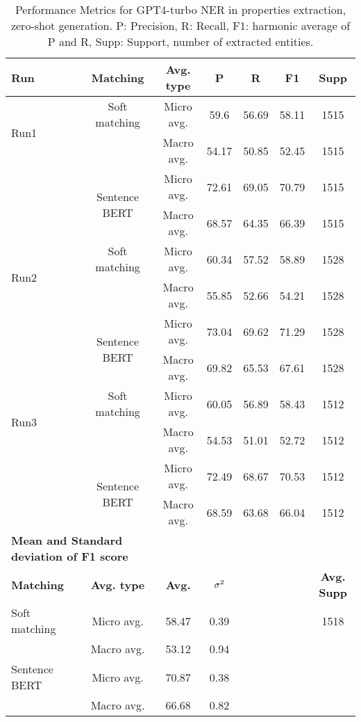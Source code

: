 \begin{table}[htbp]
\small
  \centering
  \caption{Performance Metrics for GPT4-turbo NER in properties extraction, zero-shot generation. P: Precision, R: Recall, F1: harmonic average of P and R, Supp: Support, number of extracted entities.}
  \begin{tabular}{lcccccc}
    \toprule
    \textbf{Run} & \textbf{Matching} & \textbf{Avg. type} & \textbf{P} & \textbf{R} & \textbf{F1} & \textbf{Supp} \\
    \midrule
    \multirow{2}{*}{Run1} & Soft matching & Micro avg. & 59.6 & 56.69 & 58.11 & 1515 \\
    & & Macro avg. & 54.17 & 50.85 & 52.45 & 1515 \\
    \cmidrule{2-7}
    & \multirow{2}{*}{Sentence BERT} & Micro avg. & 72.61 & 69.05 & 70.79 & 1515 \\
    & & Macro avg. & 68.57 & 64.35 & 66.39 & 1515 \\
    \midrule
    \multirow{2}{*}{Run2} & Soft matching & Micro avg. & 60.34 & 57.52 & 58.89 & 1528 \\
    & & Macro avg. & 55.85 & 52.66 & 54.21 & 1528 \\
    \cmidrule{2-7}
    & \multirow{2}{*}{Sentence BERT} & Micro avg. & 73.04 & 69.62 & 71.29 & 1528 \\
    & & Macro avg. & 69.82 & 65.53 & 67.61 & 1528 \\
    \midrule
    \multirow{2}{*}{Run3} & Soft matching & Micro avg. & 60.05 & 56.89 & 58.43 & 1512 \\
    & & Macro avg. & 54.53 & 51.01 & 52.72 & 1512 \\
    \cmidrule{2-7}
    & \multirow{2}{*}{Sentence BERT} & Micro avg. & 72.49 & 68.67 & 70.53 & 1512 \\
    & & Macro avg. & 68.59 & 63.68 & 66.04 & 1512 \\
    \midrule
    \multicolumn{2}{l}{\textbf{Mean and Standard deviation of F1 score}} & & & & & \\
    \midrule
    \textbf{Matching} & \textbf{Avg. type} & \textbf{Avg.} & $\sigma\textsuperscript{2}$ & & & \textbf{Avg. Supp}\\
    Soft matching & Micro avg. & 58.47 & 0.39 & & & 1518 \\
    & Macro avg. & 53.12 & 0.94 & & & \\
    Sentence BERT & Micro avg. & 70.87 & 0.38 & & & \\
    & Macro avg. & 66.68 & 0.82 & & & \\
    \bottomrule
  \end{tabular}
\end{table}

